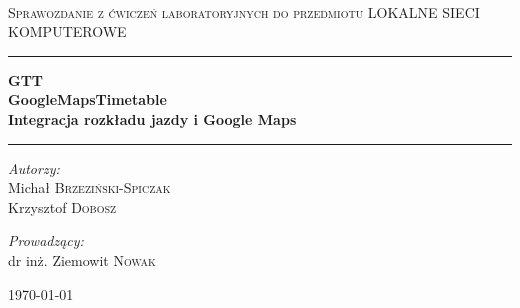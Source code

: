 \documentclass[a4paper,12pt]{article}
\begin{document}
\pagestyle{plain}

\begin{titlepage}
 


 
\\[1cm] 
 \begin{center}
 
\textsc{ Sprawozdanie z ćwiczeń laboratoryjnych do przedmiotu LOKALNE
SIECI KOMPUTEROWE}\\[1.5cm]
 
 
 \hrule height 1pt
  \par
  \vfil \vskip 0.5cm
   
{ \large \bfseries GTT\\
GoogleMapsTimetable\\
Integracja rozkładu jazdy i Google Maps}\\[0.8cm]
 
  \hrule height 1pt
  \par
  \vfil \vskip 3.5cm

\begin{minipage}{0.55\textwidth}
\begin{flushleft} \large
\emph{Autorzy:}\\
Michał \textsc{Brzeziński-Spiczak}\\
Krzysztof \textsc{Dobosz}\\
\end{flushleft}
\end{minipage}
\begin{minipage}{0.4\textwidth}
\begin{flushright} \large
\emph{Prowadzący:} \\
dr inż. Ziemowit \textsc{Nowak}
\end{flushright}
\end{minipage}
 
\vfill
 
{\large \today}
 
\end{center}
 
\end{titlepage}
\newpage
\tableofcontents
\newpage
\end{document}
